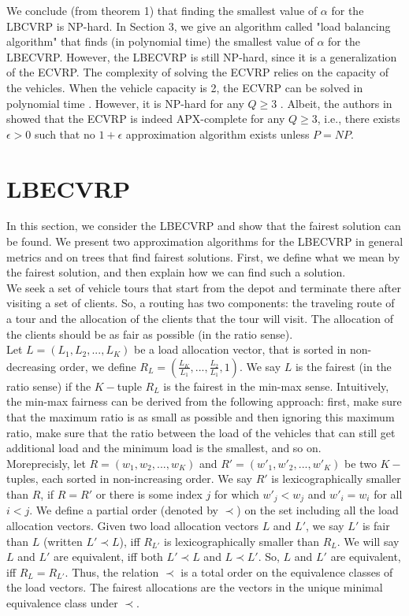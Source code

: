 \indent We conclude (from theorem 1) that finding the smallest value of $\alpha$ for the LBCVRP is NP-hard. In Section 3, we give an algorithm called "load balancing algorithm" that finds (in polynomial time) the smallest value of $\alpha$ for the LBECVRP. However, the LBECVRP is still NP-hard, since it is a generalization of the ECVRP. The complexity of solving the ECVRP relies on the capacity of the vehicles. When the vehicle capacity is 2, the ECVRP can be solved in polynomial time \cite{Asano1996}. However, it is NP-hard for any $Q\ge3$ \cite{Asano1996}. Albeit, the authors in \cite{Asano1996} showed that the ECVRP is indeed APX-complete for any $Q\ge 3$, i.e., there exists $\epsilon> 0$ such that no $1 + \epsilon$ approximation algorithm exists unless $P = NP$.
 \section{LBECVRP}
\noindent In this section, we consider the LBECVRP and show that the fairest solution can be found. We present two approximation algorithms for the LBECVRP in general metrics and on trees that find fairest solutions. First, we define what we mean by the fairest solution, and then explain how we can find such a solution.\\
\indent We seek a set of vehicle tours that start from the depot and terminate there after visiting a set of clients. So, a routing has two components: the traveling route of a tour and the allocation of the clients that the tour will visit. The allocation of the clients should be as fair as possible (in the ratio sense). \\
\indent Let $L=(L_1,L_2,...,L_K)$ be a load allocation vector, that is sorted in non-decreasing order, we define $R_{L}=(\frac{L_K}{L_1},...,\frac{L_2}{L_1},1)$. We say $L$ is the fairest (in the ratio sense) if the $K-$tuple $R_L$ is the fairest in the min-max sense. Intuitively, the min-max fairness can be derived from the following approach: first, make sure that the maximum ratio is as small as possible and then ignoring this maximum ratio, make sure that the ratio between the load of the vehicles that can still get additional load and the minimum load is the smallest, and so on.\\
\indent Moreprecisly, let $R= ({w_1},{w_2},...,{w_K})$ and $R' = ({w'_1},{w'_2},...,{w'_K})$ be two $K-$tuples, each sorted in non-increasing order. We say $R'$ is lexicographically smaller than $R$, if $R=R'$ or there is some index $j$ for which ${w'_j}<{w_j}$ and ${w'_i}= {w_i}$ for all $i<j$. We define a partial order (denoted by $\prec$) on the set including all the load allocation vectors. Given two load allocation vectors $L$ and $L'$, we say $L'$ is fair than $L$ (written $L' \prec L$), iff $R_{L'}$ is lexicographically smaller than $R_L$. We will say $L$ and $L'$ are equivalent, iff both $L' \prec L$ and $L \prec L'$. So, $L$ and $L'$ are equivalent, iff $R_L=R_{L'}$. Thus, the relation $\prec$ is a total order on the equivalence classes of the load vectors. The fairest allocations are the vectors in the unique minimal equivalence class under $\prec$. 
